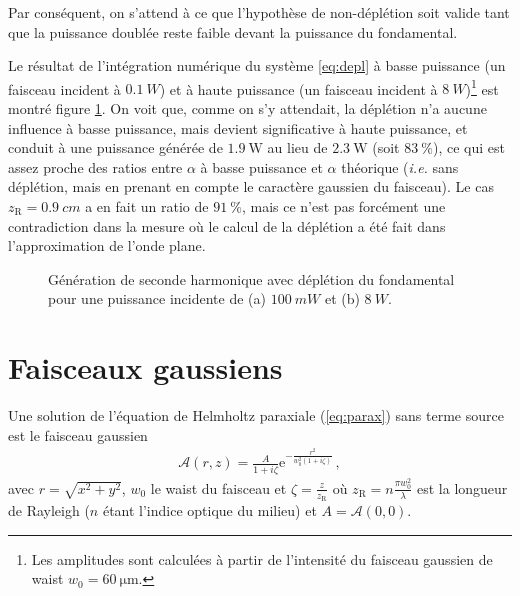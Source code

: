\documentclass[11pt,a4paper]{article}
\newcommand{\zr}{z_\mathsc{R}}
\newcommand{\A}{\mathcal{A}}
\newcommand{\e}[1]{\text{e}^{#1}}
\newcommand{\mathsc}[1]{\mathrm{\scriptscriptstyle {#1}}}
\begin{document}
Par conséquent, on s'attend à ce que l'hypothèse de non-déplétion soit valide tant que la puissance doublée reste faible devant la puissance du fondamental.

Le résultat de l'intégration numérique du système \eqref{eq:depl} à basse puissance (un faisceau incident à $\SI{0.1}{W}$) et à haute puissance (un faisceau incident à $\SI{8}{W}$)\footnote{Les amplitudes sont calculées à partir de l'intensité du faisceau gaussien de waist $w_0 = \SI{60}{\micro\meter}$.} est montré figure \ref{fig:depl}. On voit que, comme on s'y attendait, la déplétion n'a aucune influence à basse puissance, mais devient significative à haute puissance, et conduit à une puissance générée de $\SI{1.9}{\watt}$ au lieu de $\SI{2.3}{\watt}$ (soit $\SI{83}{\percent}$), ce qui est assez proche des ratios entre $\alpha$ à basse puissance et $\alpha$ théorique (\textit{i.e.} sans déplétion, mais en prenant en compte le caractère gaussien du faisceau). Le cas $\zr=\SI{0.9}{cm}$ a en fait un ratio de $\SI{91}{\percent}$, mais ce n'est pas forcément une contradiction dans la mesure où le calcul de la déplétion a été fait dans l'approximation de l'onde plane.

\begin{figure}[htpb]  
\centering
\begin{subfigure}[b]{0.47\textwidth}
	\centering
	
	\vspace{-0.8cm}
	\caption{}
\end{subfigure}
%
\hspace*{0.5cm}
\begin{subfigure}[b]{0.47\textwidth}
	\centering
	
	\vspace{-0.8cm}
	\caption{}
\end{subfigure}
\caption{Génération de seconde harmonique avec déplétion du fondamental pour une puissance incidente de (a) $\SI{100}{mW}$ et (b) $\SI{8}{W}$.}
\label{fig:depl}
\end{figure}

\section{Faisceaux gaussiens}
\label{gauss}
Une solution de l'équation de Helmholtz paraxiale (\ref{eq:parax}) sans terme source est le faisceau gaussien
\begin{align}
\A(r,z) = \frac{A}{1+i\zeta} \e{-\frac{r^{2}}{w_{0}^{2} (1+i\zeta) }} \,,
\label{eq:gauss}
\end{align}
avec $r=\sqrt{x^2+y^2}$, $w_0$ le waist du faisceau et $\zeta = \frac{z}{z_\mathsc{R}}$ où $\zr = n \frac{\pi w_0^2}{\lambda}$ est la longueur de Rayleigh ($n$ étant l'indice optique du milieu) et $A = \A(0,0)$.
\end{document}
